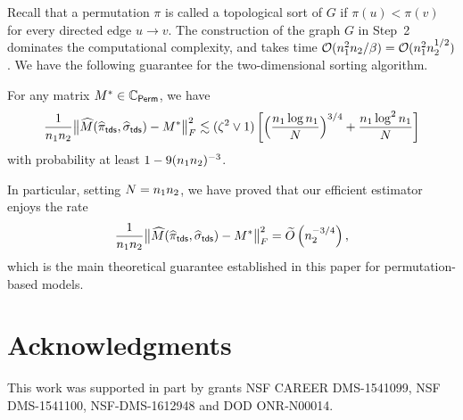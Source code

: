 \documentclass[final,12pt]{colt2018} %
\begin{document}
Recall that a permutation $\pi$ is called a topological sort of $G$ if $\pi(u)<\pi(v)$ for every directed edge $u \to v$.
The construction of the graph $G$ in Step~2 dominates the
computational complexity, and takes time $\mathcal{O}(n_1^2 n_2 /
\beta) = \mathcal{O}(n_1^2 n_2^{1/2})$. We have the following
guarantee for the two-dimensional sorting algorithm.

\begin{theorem} \label{thm:fast-tds}
For any matrix $M^* \in \mathbb{C}_{\mathsf{Perm}}$, we have
\begin{align*}
\frac{1}{n_1 n_2} \big\|\widehat{M}(\widehat{\pi}_{\sf tds}, \widehat{\sigma}_{\sf tds}) - M^*
\big\|_F^2 \lesssim (\zeta^2 \lor 1) \left[ \Big(\frac{n_1 \log
    n_1}{N} \Big)^{3/4} + \frac{n_1 \log^2 n_1}{N} \right]
\end{align*}
with probability at least $1- 9(n_1 n_2)^{-3}$.
\end{theorem}

In particular, setting $N = n_1 n_2$, we have proved that our
efficient estimator enjoys the rate
\begin{align*}
\frac{1}{n_1 n_2} \big\|\widehat{M}(\widehat{\pi}_{\sf tds}, \widehat{\sigma}_{\sf tds}) - M^*
\big\|_F^2 = \widetilde O \left(n_2^{-3/4}\right),
\end{align*}
which is the main theoretical guarantee established in this paper for
permutation-based models.


\section*{Acknowledgments}

This work was supported in part by grants NSF CAREER DMS-1541099, NSF DMS-1541100, NSF-DMS-1612948 and DOD ONR-N00014.


%

\end{document}
